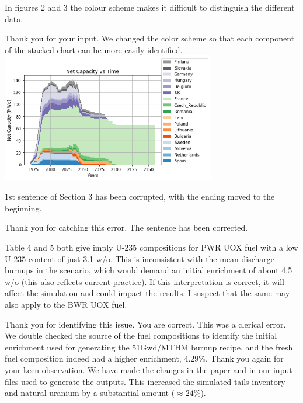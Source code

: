 \documentclass[answers,11pt]{exam}
\begin{document}
\begin{questions}
        \question In figures 2 and 3 the colour scheme makes it difficult to 
        distinguish the different data.
        \begin{solution}
        	Thank you for your input. We changed the color scheme so that
        	each component of the stacked chart can be more easily identified.
        	\includegraphics[width=0.7\textwidth]{../images/eu_future/onesim.png}
        \end{solution}

        \question 1st sentence of Section 3 has been corrupted, with the ending 
        moved to the beginning.

        \begin{solution}
                Thank you for catching this error. The sentence has been corrected.
        \end{solution}

        \question Table 4 and 5 both give imply U-235 compositions for PWR UOX 
        fuel with a low U-235 content of just 3.1 w/o. This is inconsistent 
        with the mean discharge burnups in the scenario, which would demand an 
        initial enrichment of about 4.5 w/o (this also reflects current 
        practice). If this interpretation is correct, it will affect the 
        simulation and could impact the results. I suspect that the same may 
        also apply to the BWR UOX fuel. 
        \begin{solution}
                Thank you for identifying this issue. You are correct. This was a clerical error. 
                We double checked the source of the fuel compositions to identify the
                initial enrichment used for generating the 51Gwd/MTHM burnup
                recipe, and the fresh fuel composition indeed had a higher
                enrichment, $4.29 \%$. Thank you again for your keen observation.
                We have made the changes in the paper and in our input files
                used to generate the outputs. This increased the simulated 
                tails inventory
                and natural uranium by a substantial amount ($\approx 24\%$).
        \end{solution}


\end{questions}
\end{document}
